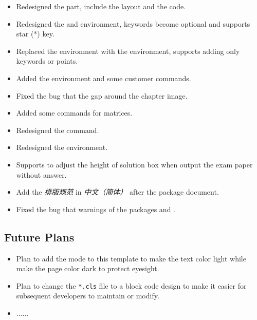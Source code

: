 \begin{itemize}
    \item Redesigned the  part, include the layout and the code.
    \item Redesigned the  and  environment, keywords become optional and supports star (*) key. 
    \item Replaced the  environment with the  environment, supports adding only keywords or points.
    \item Added the  environment and some customer commands.
\end{itemize}

\begin{itemize}
    \item Fixed the bug that the gap around the chapter image.
    \item Added some commands for matrices.
    \item Redesigned the  command.
    \item Redesigned the  environment.
    \item Supports to adjust the height of solution box when output the exam paper without answer.
    \item Add the \emph{排版规范} in \emph{中文（简体）} after the package document.
    \item Fixed the bug that warnings of the packages  and .
\end{itemize}

\subsection*{Future Plans}
\begin{itemize}
    \item Plan to add the  mode to this template to make the text color light while make the page color dark to protect eyesight.
    \item Plan to change the \verb|*.cls| file to a block code design to make it easier for subsequent developers to maintain or modify.
    \item ......
\end{itemize}